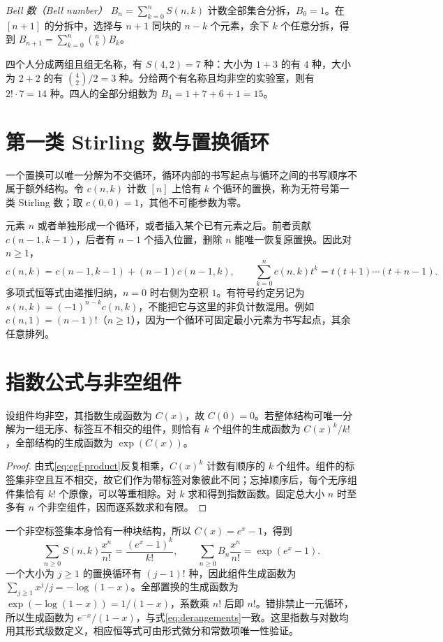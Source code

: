 \emph{Bell 数（Bell number）} $B_n=\sum_{k=0}^nS(n,k)$ 计数全部集合分拆，$B_0=1$。在 $[n+1]$ 的分拆中，选择与 $n+1$ 同块的 $n-k$ 个元素，余下 $k$ 个任意分拆，得到 $B_{n+1}=\sum_{k=0}^n\binom nkB_k$。

\begin{example}
四个人分成两组且组无名称，有 $S(4,2)=7$ 种：大小为 $1+3$ 的有 $4$ 种，大小为 $2+2$ 的有 $\binom42/2=3$ 种。分给两个有名称且均非空的实验室，则有 $2!\cdot7=14$ 种。四人的全部分组数为 $B_4=1+7+6+1=15$。
\end{example}

\section{第一类 Stirling 数与置换循环}

一个置换可以唯一分解为不交循环，循环内部的书写起点与循环之间的书写顺序不属于额外结构。令 $c(n,k)$ 计数 $[n]$ 上恰有 $k$ 个循环的置换，称为无符号第一类 Stirling 数；取 $c(0,0)=1$，其他不可能参数为零。

元素 $n$ 或者单独形成一个循环，或者插入某个已有元素之后。前者贡献 $c(n-1,k-1)$，后者有 $n-1$ 个插入位置，删除 $n$ 能唯一恢复原置换。因此对 $n\ge1$，
\[
 c(n,k)=c(n-1,k-1)+(n-1)c(n-1,k),\qquad
 \sum_{k=0}^n c(n,k)t^k=t(t+1)\cdots(t+n-1).
\]
多项式恒等式由递推归纳，$n=0$ 时右侧为空积 $1$。有符号约定另记为 $s(n,k)=(-1)^{n-k}c(n,k)$，不能把它与这里的非负计数混用。例如 $c(n,1)=(n-1)!$（$n\ge1$），因为一个循环可固定最小元素为书写起点，其余任意排列。

\section{指数公式与非空组件}

\begin{theorem}[标号结构的指数公式]
设组件均非空，其指数生成函数为 $C(x)$，故 $C(0)=0$。若整体结构可唯一分解为一组无序、标签互不相交的组件，则恰有 $k$ 个组件的生成函数为 $C(x)^k/k!$，全部结构的生成函数为 $\exp(C(x))$。
\end{theorem}
\begin{proof}
由式\eqref{eq:egf-product}反复相乘，$C(x)^k$ 计数有顺序的 $k$ 个组件。组件的标签集非空且互不相交，故它们作为带标签对象彼此不同；忘掉顺序后，每个无序组件集恰有 $k!$ 个原像，可以等重相除。对 $k$ 求和得到指数函数。固定总大小 $n$ 时至多有 $n$ 个非空组件，因而逐系数求和有限。
\end{proof}

一个非空标签集本身恰有一种块结构，所以 $C(x)=e^x-1$，得到
\begin{equation}
 \sum_{n\ge0}S(n,k)\frac{x^n}{n!}=\frac{(e^x-1)^k}{k!},\qquad
 \sum_{n\ge0}B_n\frac{x^n}{n!}=\exp(e^x-1).
 \label{eq:stirling-bell-egf}
\end{equation}
一个大小为 $j\ge1$ 的置换循环有 $(j-1)!$ 种，因此组件生成函数为 $\sum_{j\ge1}x^j/j=-\log(1-x)$。全部置换的生成函数为 $\exp(-\log(1-x))=1/(1-x)$，系数乘 $n!$ 后即 $n!$。错排禁止一元循环，所以生成函数为 $e^{-x}/(1-x)$，与式\eqref{eq:derangements}一致。这里指数与对数均用其形式级数定义，相应恒等式可由形式微分和常数项唯一性验证。

